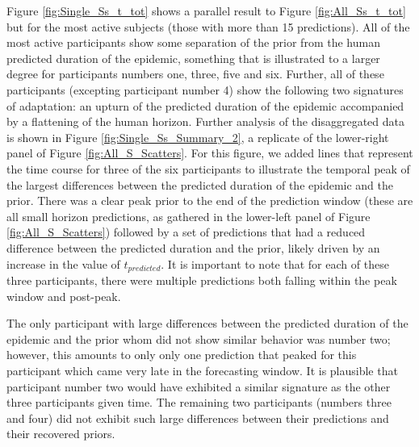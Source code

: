 Figure \ref{fig:Single_Ss_t_tot} shows a parallel result to Figure \ref{fig:All_Ss_t_tot} but for the most active subjects (those with more than 15 predictions).  All of the most active participants show some separation of the prior from the human predicted duration of the epidemic, something that is illustrated to a larger degree for participants numbers one, three, five and six.  Further, all of these participants (excepting participant number 4) show the following two signatures of adaptation: an upturn of the predicted duration of the epidemic accompanied by a flattening of the human horizon.  Further analysis of the disaggregated data is shown in Figure \ref{fig:Single_Ss_Summary_2}, a replicate of the lower-right panel of Figure \ref{fig:All_S_Scatters}. For this figure, we added lines that represent the time course for three of the six participants to illustrate the temporal peak of the largest differences between the predicted duration of the epidemic and the prior.  There was a clear peak prior to the end of the prediction window (these are all small horizon predictions, as gathered in the lower-left panel of Figure \ref{fig:All_S_Scatters}) followed by a set of predictions that had a reduced difference between the predicted duration and the prior, likely driven by an increase in the value of $t_{predicted}$.  It is important to note that for each of these three participants, there were multiple predictions both falling within the peak window and post-peak. 

The only participant with large differences between the predicted duration of the epidemic and the prior whom did not show similar behavior was number two; however, this amounts to only only one prediction that peaked for this participant which came very late in the forecasting window.  It is plausible that participant number two would have exhibited a similar signature as the other three participants given time.  The remaining two participants (numbers three and four)  did not exhibit such large differences between their predictions and their recovered priors. 

